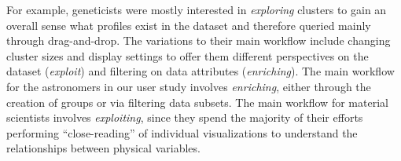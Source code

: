 \par  For example, geneticists were mostly interested in \textit{exploring} clusters to gain an overall sense what profiles exist in the dataset  and therefore queried mainly through drag-and-drop. The variations to their main workflow include changing cluster sizes and display settings to offer them different perspectives on the dataset (\textit{exploit}) and filtering on data attributes (\textit{enriching}). 
The main workflow for the astronomers in our user study involves \textit{enriching}, either through the creation of groups or via filtering data subsets. The main workflow for material scientists involves \textit{exploiting}, since they spend the majority of their efforts performing ``close-reading'' of individual visualizations to understand the relationships between  physical variables. %
